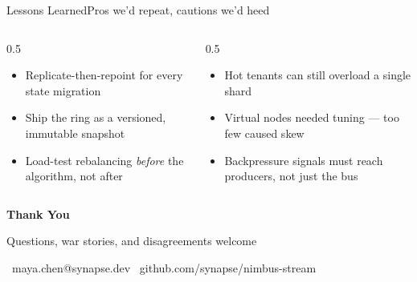 \documentclass[aspectratio=169,10pt]{beamer}
\begin{document}
\begin{frame}{Lessons Learned}{Pros we'd repeat, cautions we'd heed}
  \begin{columns}[T,onlytextwidth]
    \begin{column}{0.5\textwidth}
      \begin{tcolorbox}[colback=tealAccent!8, colframe=tealAccent,
          title={\faThumbsUp\ Do Again}, coltitle=white,
          colbacktitle=navySoft, fonttitle=\bfseries]
        \begin{itemize}\small
          \item Replicate-then-repoint for every state migration
          \item Ship the ring as a versioned, immutable snapshot
          \item Load-test rebalancing \emph{before} the algorithm, not after
        \end{itemize}
      \end{tcolorbox}
    \end{column}
    \begin{column}{0.5\textwidth}
      \begin{tcolorbox}[colback=amberAccent!10, colframe=amberAccent,
          title={\faExclamationTriangle\ Watch For}, coltitle=white,
          colbacktitle=navySoft, fonttitle=\bfseries]
        \begin{itemize}\small
          \item Hot tenants can still overload a single shard
          \item Virtual nodes needed tuning --- too few caused skew
          \item Backpressure signals must reach producers, not just the bus
        \end{itemize}
      \end{tcolorbox}
    \end{column}
  \end{columns}
\end{frame}

\begin{frame}[plain]
  \vfill
  \centering
  {\color{white}\Huge\bfseries Thank You\par}
  \vspace{0.5em}
  {\color{tealAccent}\large Questions, war stories, and disagreements welcome\par}
  \vspace{1.4em}
  {\color{white}\small \faEnvelope\ maya.chen@synapse.dev \hspace{1.2em} \faCode\ github.com/synapse/nimbus-stream\par}
  \vfill
\end{frame}
\end{document}

